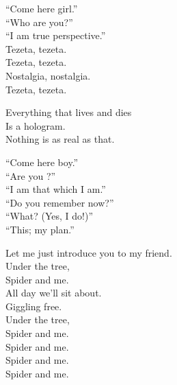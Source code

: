 ``Come here girl.'' \\
``Who are you?'' \\
``I am true perspective.'' \\

Tezeta, tezeta. \\
Tezeta, tezeta. \\
Nostalgia, nostalgia. \\
Tezeta, tezeta. \\


Everything that lives and dies \\
Is a hologram. \\
Nothing is as real as that. \\


``Come here boy.'' \\
``Are you ?'' \\
``I am that which I am.'' \\

``Do you remember now?'' \\
``What? (Yes, I do!)'' \\
``This; my  plan.'' \\









Let me just introduce you to my friend. \\
Under the tree, \\
Spider and me. \\
All day we'll sit about. \\
Giggling free. \\
Under the tree, \\
Spider and me. \\

Spider and me. \\
Spider and me. \\
Spider and me. \\

